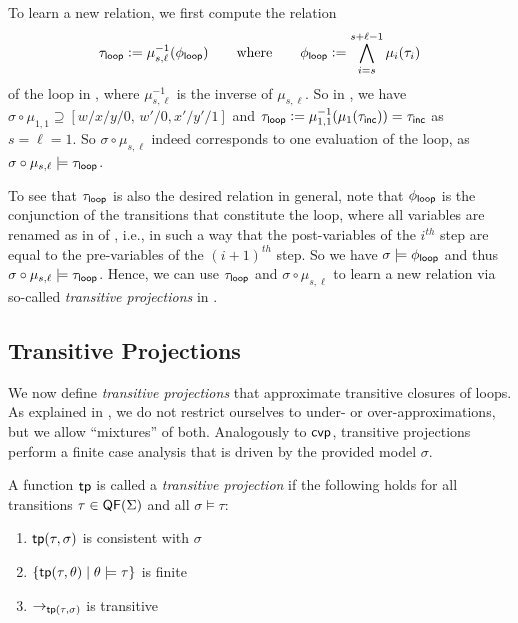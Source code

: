 To learn a new relation,
we first compute the  relation\paper{ \pagebreak[3]} 
\begin{equation}
  \label{eq:loop-formula}
  \paper{\textstyle}
  \tau_\Loop \Def \mu_{s,\ell}^{-1}(\phi_\Loop) \qquad \text{where} \qquad \phi_\Loop \Def
  \bigwedge_{i=s}^{s+\ell-1} \mu_{i}(\tau_i) 
\end{equation}
of the loop in , where $\mu^{-1}_{s,\ell}$ is the inverse of $\mu_{s,\ell}$.
%
So in , we have $\sigma \circ \mu_{1,1} \supseteq [w/x/y/0,\,
  w'/0,x'/y'/1]$ and $\tau_{\mathsf{loop}} \mathrel{\mathop:}= \mu^{-1}_{1,1}(\mu_1(\tau_{\mathsf{inc}})) = \tau_{\mathsf{inc}}$ as $s = \ell = 1$.
%
So $\sigma \circ \mu_{s,\ell}$ indeed corresponds to one evaluation of the loop, as $\sigma \circ \mu_{s,\ell} \models \tau_{\mathsf{loop}}$.

To see that $\tau_{\mathsf{loop}}$ is also the desired relation in general, note that $\phi_\Loop$ is the conjunction of the transitions that constitute the loop, where all variables are renamed as in  of , i.e., in such a way that the post-variables of the $i^{th}$ step are equal to the pre-variables of the $(i+1)^{th}$ step.
%
So we have $\sigma \models \phi_\Loop$ and thus $\sigma \circ \mu_{s,\ell} \models \tau_{\mathsf{loop}}$.
%
Hence,
we can use $\tau_{\mathsf{loop}}$ and $\sigma \circ \mu_{s,\ell}$ to learn a new relation via
so-called \emph{transitive projections}
in .


\subsection{Transitive Projections}
\label{sec:transitiveProjections}



We now define \emph{transitive projections} that approximate transitive closures of loops.
%
As explained in , we do not restrict ourselves to under- or over-approximations, but we allow ``mixtures'' of both.
%
Analogously to $\mathsf{cvp}$, transitive projections perform a finite case analysis that is
driven by the provided model $\sigma$.

\begin{definition}
  \label{def:ti}
  A function $\mathsf{tp}$ is called a \emph{transitive projection}
  if the following holds for all transitions $\tau \in \mathsf{QF}(\Sigma)$ and all $\sigma \models \tau$:
  \begin{minipage}[t]{0.49\textwidth}
    \begin{enumerate}
    \item $\mathsf{tp}(\tau,\sigma)$ is consistent with $\sigma$
    \item $\{\mathsf{tp}(\tau,\theta) \mid \theta \models \tau\}$ is finite
    \end{enumerate}
  \end{minipage}
  \begin{minipage}[t]{0.49\textwidth}
    \begin{enumerate}
      \setcounter{enumi}{2}
    \item $\to_{\mathsf{tp}(\tau,\sigma)}$ is transitive
    \end{enumerate}
  \end{minipage}
\end{definition}

